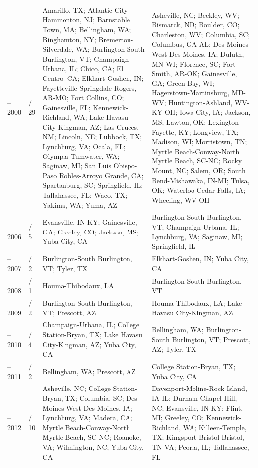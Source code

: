 \begin{longtable}[t]{>{\raggedright\arraybackslash}p{1.8cm}>{\centering\arraybackslash}p{1.2cm}>{\raggedright\arraybackslash}p{5.8cm}>{\raggedright\arraybackslash}p{5.8cm}}
\endfoot
\bottomrule
\endlastfoot
1990--2000 & 30 / 29 & Amarillo, TX; Atlantic City-Hammonton, NJ; Barnstable Town, MA; Bellingham, WA; Binghamton, NY; Bremerton-Silverdale, WA; Burlington-South Burlington, VT; Champaign-Urbana, IL; Chico, CA; El Centro, CA; Elkhart-Goshen, IN; Fayetteville-Springdale-Rogers, AR-MO; Fort Collins, CO; Gainesville, FL; Kennewick-Richland, WA; Lake Havasu City-Kingman, AZ; Las Cruces, NM; Lincoln, NE; Lubbock, TX; Lynchburg, VA; Ocala, FL; Olympia-Tumwater, WA; Saginaw, MI; San Luis Obispo-Paso Robles-Arroyo Grande, CA; Spartanburg, SC; Springfield, IL; Tallahassee, FL; Waco, TX; Yakima, WA; Yuma, AZ & Asheville, NC; Beckley, WV; Bismarck, ND; Boulder, CO; Charleston, WV; Columbia, SC; Columbus, GA-AL; Des Moines-West Des Moines, IA; Duluth, MN-WI; Florence, SC; Fort Smith, AR-OK; Gainesville, GA; Green Bay, WI; Hagerstown-Martinsburg, MD-WV; Huntington-Ashland, WV-KY-OH; Iowa City, IA; Jackson, MS; Lawton, OK; Lexington-Fayette, KY; Longview, TX; Madison, WI; Morristown, TN; Myrtle Beach-Conway-North Myrtle Beach, SC-NC; Rocky Mount, NC; Salem, OR; South Bend-Mishawaka, IN-MI; Tulsa, OK; Waterloo-Cedar Falls, IA; Wheeling, WV-OH\\
2000--2006 & 5 / 5 & Evansville, IN-KY; Gainesville, GA; Greeley, CO; Jackson, MS; Yuba City, CA & Burlington-South Burlington, VT; Champaign-Urbana, IL; Lynchburg, VA; Saginaw, MI; Springfield, IL\\
2006--2007 & 2 / 2 & Burlington-South Burlington, VT; Tyler, TX & Elkhart-Goshen, IN; Yuba City, CA\\
2007--2008 & 1 / 1 & Houma-Thibodaux, LA & Burlington-South Burlington, VT\\
2008--2009 & 2 / 2 & Burlington-South Burlington, VT; Prescott, AZ & Houma-Thibodaux, LA; Lake Havasu City-Kingman, AZ\\
\addlinespace
2009--2010 & 4 / 4 & Champaign-Urbana, IL; College Station-Bryan, TX; Lake Havasu City-Kingman, AZ; Yuba City, CA & Bellingham, WA; Burlington-South Burlington, VT; Prescott, AZ; Tyler, TX\\
2010--2011 & 2 / 2 & Bellingham, WA; Prescott, AZ & College Station-Bryan, TX; Yuba City, CA\\
2011--2012 & 10 / 10 & Asheville, NC; College Station-Bryan, TX; Columbia, SC; Des Moines-West Des Moines, IA; Lynchburg, VA; Madera, CA; Myrtle Beach-Conway-North Myrtle Beach, SC-NC; Roanoke, VA; Wilmington, NC; Yuba City, CA & Davenport-Moline-Rock Island, IA-IL; Durham-Chapel Hill, NC; Evansville, IN-KY; Flint, MI; Greeley, CO; Kennewick-Richland, WA; Killeen-Temple, TX; Kingsport-Bristol-Bristol, TN-VA; Peoria, IL; Tallahassee, FL\\

\end{longtable}
